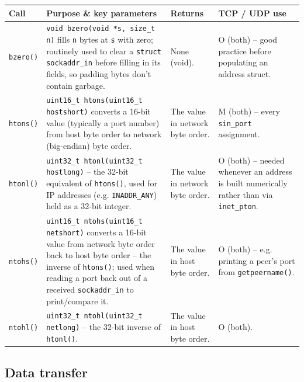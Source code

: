 \documentclass[11pt,a4paper]{article}
\begin{document}
\begin{longtable}{|p{2.6cm}|p{6.6cm}|p{2cm}|p{3.6cm}|}
\hline
\textbf{Call} & \textbf{Purpose \& key parameters} & \textbf{Returns} & \textbf{TCP / UDP use} \\ \hline
\endhead

\texttt{bzero()} &
\texttt{void bzero(void *s, size\_t n)} fills \texttt{n} bytes at \texttt{s} with zero;
routinely used to clear a \texttt{struct sockaddr\_in} before filling in its fields, so
padding bytes don't contain garbage. &
None (void). &
O (both) -- good practice before populating an address struct. \\ \hline

\texttt{htons()} &
\texttt{uint16\_t htons(uint16\_t hostshort)} converts a 16-bit value (typically a port
number) from host byte order to network (big-endian) byte order. &
The value in network byte order. &
M (both) -- every \texttt{sin\_port} assignment. \\ \hline

\texttt{htonl()} &
\texttt{uint32\_t htonl(uint32\_t hostlong)} -- the 32-bit equivalent of \texttt{htons()},
used for IP addresses (e.g. \texttt{INADDR\_ANY}) held as a 32-bit integer. &
The value in network byte order. &
O (both) -- needed whenever an address is built numerically rather than via
\texttt{inet\_pton}. \\ \hline

\texttt{ntohs()} &
\texttt{uint16\_t ntohs(uint16\_t netshort)} converts a 16-bit value from network byte order
back to host byte order -- the inverse of \texttt{htons()}; used when reading a port back
out of a received \texttt{sockaddr\_in} to print/compare it. &
The value in host byte order. &
O (both) -- e.g. printing a peer's port from \texttt{getpeername()}. \\ \hline

\texttt{ntohl()} &
\texttt{uint32\_t ntohl(uint32\_t netlong)} -- the 32-bit inverse of \texttt{htonl()}. &
The value in host byte order. &
O (both). \\ \hline

\end{longtable}

\subsection{Data transfer}
\end{document}

